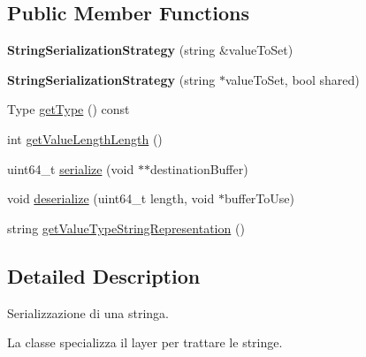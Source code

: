 \subsection*{Public Member Functions}
\begin{DoxyCompactItemize}
\item 
\hypertarget{class_string_serialization_strategy_a357222998f019b636e83dbb227ff0a58}{
{\bfseries StringSerializationStrategy} (string \&valueToSet)}
\label{class_string_serialization_strategy_a357222998f019b636e83dbb227ff0a58}

\item 
\hypertarget{class_string_serialization_strategy_acaaaa5fa5c29a60cb662b84f71c660a5}{
{\bfseries StringSerializationStrategy} (string $\ast$valueToSet, bool shared)}
\label{class_string_serialization_strategy_acaaaa5fa5c29a60cb662b84f71c660a5}

\item 
Type \hyperlink{class_string_serialization_strategy_a46f4f7f5d3ff5422a3167c0a1b41443d}{getType} () const 
\item 
int \hyperlink{class_string_serialization_strategy_ace7b81781e94b30ff63e300570f7661c}{getValueLengthLength} ()
\item 
uint64\_\-t \hyperlink{class_string_serialization_strategy_a17a716d8afc1f185b2e6576872bfe4d2}{serialize} (void $\ast$$\ast$destinationBuffer)
\item 
void \hyperlink{class_string_serialization_strategy_aaf2bf370860b4a956f8fe83b7af16ed2}{deserialize} (uint64\_\-t length, void $\ast$bufferToUse)
\item 
string \hyperlink{class_string_serialization_strategy_a1119c0a44a081e92482308c5fe1efd20}{getValueTypeStringRepresentation} ()
\end{DoxyCompactItemize}


\subsection{Detailed Description}
Serializzazione di una stringa. 

La classe specializza il layer per trattare le stringe. 

